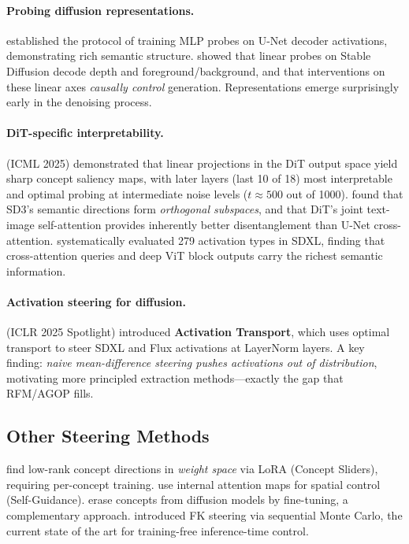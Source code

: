 \documentclass[11pt]{article}
\begin{document}
\paragraph{Probing diffusion representations.}
\citet{baranchuk2022label} established the protocol of training MLP probes on U-Net decoder activations, demonstrating rich semantic structure.
\citet{chen2023scene} showed that linear probes on Stable Diffusion decode depth and foreground/background, and that interventions on these linear axes \emph{causally control} generation.
Representations emerge surprisingly early in the denoising process.

\paragraph{DiT-specific interpretability.}
\citet{conceptattention2025} (ICML 2025) demonstrated that linear projections in the DiT output space yield sharp concept saliency maps, with later layers (last 10 of 18) most interpretable and optimal probing at intermediate noise levels ($t \approx 500$ out of 1000).
\citet{park2024dit} found that SD3's semantic directions form \emph{orthogonal subspaces}, and that DiT's joint text-image self-attention provides inherently better disentanglement than U-Net cross-attention.
\citet{notallactivations2024} systematically evaluated 279 activation types in SDXL, finding that cross-attention queries and deep ViT block outputs carry the richest semantic information.

\paragraph{Activation steering for diffusion.}
\citet{lyu2025activation} (ICLR 2025 Spotlight) introduced \textbf{Activation Transport}, which uses optimal transport to steer SDXL and Flux activations at LayerNorm layers.
A key finding: \emph{naive mean-difference steering pushes activations out of distribution}, motivating more principled extraction methods---exactly the gap that RFM/AGOP fills.

\subsection{Other Steering Methods}

\citet{gandikota2023concept} find low-rank concept directions in \emph{weight space} via LoRA (Concept Sliders), requiring per-concept training.
\citet{epstein2023selfguidance} use internal attention maps for spatial control (Self-Guidance).
\citet{gandikota2023erasing} erase concepts from diffusion models by fine-tuning, a complementary approach.
\citet{singhal2025fksteering} introduced FK steering via sequential Monte Carlo, the current state of the art for training-free inference-time control.
\end{document}
